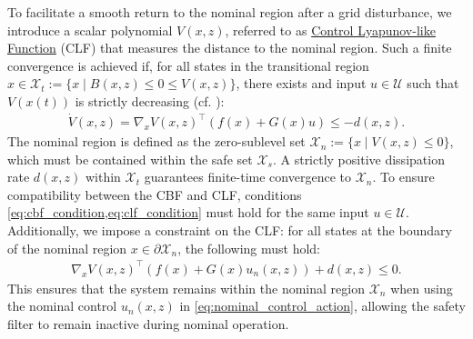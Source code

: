 \documentclass[lettersize,journal]{IEEEtran}
\newcommand{\markAsChanged}[1]{{\color{black}#1}}
\begin{document}
To facilitate a smooth return to the nominal region after a grid disturbance, we introduce a scalar polynomial $V(x, z)$, referred to as \underline{Control Lyapunov-like Function} (CLF) that measures the distance to the nominal region.
Such a finite convergence is achieved if, for all states in the transitional region \markAsChanged{$x \in \mathcal X_t := \{ x \mid B(x, z) \leq 0 \leq V(x,z) \}$}, there exists and input $u \in \mathcal U$ such that $V(x(t))$ is strictly decreasing (cf. \cite{schneeberger2024advanced}):
\begin{align} \label{eq:clf_condition}
    \dot V(x, z) = \nabla_x V(x, z)^\top \left ( f(x) + G(x) u \right ) \leq - d(x, z).
\end{align}
The nominal region is defined as the zero-sublevel set $\mathcal X_n := \{ x \mid V(x, z) \leq 0 \}$, which must be contained within the safe set $\mathcal X_s$.
A strictly positive dissipation rate $d(x, z)$ within $\mathcal X_t$ guarantees finite-time convergence to $\mathcal X_n$.
To ensure compatibility between the CBF and CLF, conditions \cref{eq:cbf_condition,eq:clf_condition} must hold for the same input $u \in \mathcal U$.
Additionally, we impose a constraint on the CLF: for all states at the boundary of the nominal region $x \in \partial \mathcal X_n$, the following must hold:
\begin{align} \label{eq:clf_condition_un}
    \nabla_x V(x, z)^\top \left ( f(x) + G(x) u_n(x, z) \right ) + d(x, z) \leq 0.
\end{align}
\markAsChanged{This ensures that the system remains within the nominal region $\mathcal X_n$ when using the nominal control $u_n(x, z)$ in \cref{eq:nominal_control_action}, allowing the safety filter to remain inactive during nominal operation.}
\end{document}

